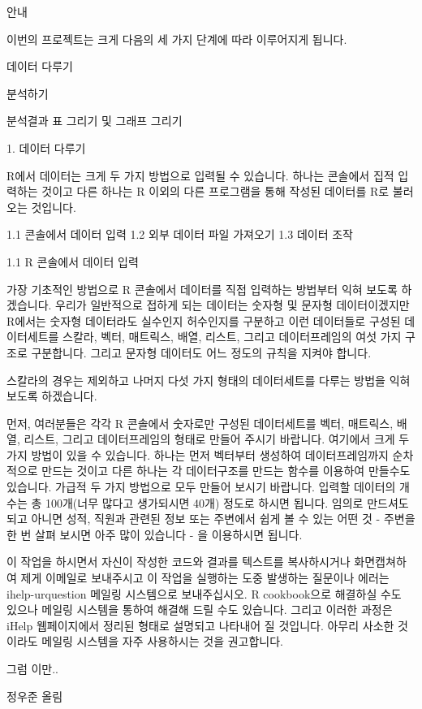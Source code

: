 안내

이번의 프로젝트는 크게 다음의 세 가지 단계에 따라 이루어지게 됩니다.

데이터 다루기

분석하기

분석결과 표 그리기 및 그래프 그리기

1.  데이터 다루기

R에서 데이터는 크게 두 가지 방법으로 입력될 수 있습니다. 하나는 콘솔에서 집적 입력하는 것이고 다른 하나는 R 이외의 다른 프로그램을 통해 작성된 데이터를 R로 불러오는 것입니다.

1.1 콘솔에서 데이터 입력
1.2 외부 데이터 파일 가져오기
1.3 데이터 조작

1.1 R 콘솔에서 데이터 입력

가장 기초적인 방법으로 R 콘솔에서 데이터를 직접 입력하는 방법부터 익혀 보도록 하겠습니다. 우리가 일반적으로 접하게 되는 데이터는 숫자형 및 문자형 데이터이겠지만 R에서는 숫자형 데이터라도 실수인지 허수인지를 구분하고 이런 데이터들로 구성된 데이터세트를 스칼라, 벡터, 매트릭스, 배열, 리스트, 그리고 데이터프레임의 여섯 가지 구조로 구분합니다. 그리고 문자형 데이터도 어느 정도의 규칙을 지켜야 합니다.

스칼라의 경우는 제외하고 나머지 다섯 가지 형태의 데이터세트를 다루는 방법을 익혀 보도록 하겠습니다.

먼저, 여러분들은 각각 R 콘솔에서 숫자로만 구성된 데이터세트를 벡터, 매트릭스, 배열, 리스트, 그리고 데이터프레임의 형태로 만들어 주시기 바랍니다. 여기에서 크게 두 가지 방법이 있을 수 있습니다. 하나는 먼저 벡터부터 생성하여 데이터프레임까지 순차적으로 만드는 것이고 다른 하나는 각 데이터구조를 만드는 함수를 이용하여 만들수도 있습니다. 가급적 두 가지 방법으로 모두 만들어 보시기 바랍니다. 입력할 데이터의 개수는 총 100개(너무 많다고 생가되시면 40개) 정도로 하시면 됩니다. 임의로 만드셔도 되고 아니면 성적, 직원과 관련된 정보 또는 주변에서 쉽게 볼 수 있는 어떤 것 - 주변을 한 번 살펴 보시면 아주 많이 있습니다 - 을 이용하시면 됩니다.

이 작업을 하시면서 자신이 작성한 코드와 결과를 텍스트를 복사하시거나 화면캡쳐하여 제게 이메일로 보내주시고 이 작업을 실행하는 도중 발생하는 질문이나 에러는 ihelp-urquestion 메일링 시스템으로 보내주십시오. R cookbook으로 해결하실 수도 있으나 메일링 시스템을 통하여 해결해 드릴 수도 있습니다. 그리고 이러한 과정은 iHelp 웹페이지에서 정리된 형태로 설명되고 나타내어 질 것입니다. 아무리 사소한 것이라도 메일링 시스템을 자주 사용하시는 것을 권고합니다.

그럼 이만..

정우준 올림